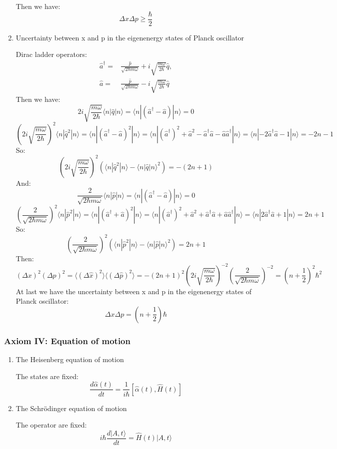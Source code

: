 \documentclass[12pt]{article}
\numberwithin{equation}{section}
\begin{document}
\begin{enumerate}
	Then we have:
	\begin{equation}
		\Delta x \Delta p \geq \frac{\hbar}{2}
	\end{equation}
\item Uncertainty between x and p in the eigenenergy states of Planck oscillator \par
	Dirac ladder operators:
	\begin{equation}\begin{split}
		\hat{a}^\dag=&\frac{\hat{p}}{\sqrt{2\hbar m\omega}}+i\sqrt{\frac{m\omega}{2\hbar}}\hat{q},\\
		\hat{a}=&\frac{\hat{p}}{\sqrt{2\hbar m\omega}}-i\sqrt{\frac{m\omega}{2\hbar}}\hat{q}
	\end{split}\end{equation}
	Then we have:
	\[2i\sqrt{\frac{m\omega}{2\hbar}}\langle n|\hat{q}|n\rangle=\langle n|(\hat{a}^\dag-\hat{a})|n\rangle=0\]
	\[(2i\sqrt{\frac{m\omega}{2\hbar}})^2\langle n|\hat{q}^2|n\rangle
	=\langle n|(\hat{a}^\dag-\hat{a})^2|n\rangle
	=\langle n|(\hat{a}^\dag)^2+\hat{a}^2-\hat{a}^{\dag} \hat{a}-\hat{a}\hat{a}^{\dag}|n\rangle
	=\langle n|-2\hat{a}^\dag\hat{a}-1|n \rangle=-2n-1\]
	So:
	\[(2i\sqrt{\frac{m\omega}{2\hbar}})^2(\langle n|\hat{q}^2|n\rangle-\langle n|\hat{q}|n\rangle^2)=-(2n+1)\]
	And:
	\[\frac{2}{\sqrt{2\hbar m\omega}}\langle n|\hat{p}|n\rangle=\langle n|(\hat{a}^\dag-\hat{a})|n\rangle=0\]
	\[(\frac{2}{\sqrt{2\hbar m\omega}})^2\langle n|\hat{p}^2|n\rangle
	=\langle n|(\hat{a}^\dag+\hat{a})^2|n\rangle
	=\langle n|(\hat{a}^\dag)^2+\hat{a}^2+\hat{a}^{\dag} \hat{a}+\hat{a}\hat{a}^{\dag}|n\rangle
	=\langle n|2\hat{a}^\dag\hat{a}+1|n \rangle=2n+1\]
	So:
	\[(\frac{2}{\sqrt{2\hbar m\omega}})^2(\langle n|\hat{p}^2|n\rangle-\langle n|\hat{p}|n\rangle^2)=2n+1\]
	Then:
	\[(\Delta x)^2(\Delta p)^2=\langle(\Delta \hat{x})^2 \rangle \langle(\Delta \hat{p})^2 \rangle=-(2n+1)^2(2i\sqrt{\frac{m\omega}{2\hbar}})^{-2}(\frac{2}{\sqrt{2\hbar m\omega}})^{-2}=(n+\frac{1}{2})^2\hbar^2\]
	At last we have the uncertainty between x and p in the eigenenergy states of Planck oscillator:
	\begin{equation}
		\Delta x\Delta p=(n+\frac{1}{2})\hbar
	\end{equation}
\end{enumerate}
\subsubsection{Axiom IV: Equation of motion}
\begin{enumerate}
\item The Heisenberg equation of motion \par
	The states are fixed: 
	\begin{equation}
		\frac{d\hat{\alpha}(t)}{dt}=\frac{1}{i\hbar}[\hat{\alpha}(t), \hat{H}(t)]
	\end{equation}
\item The Schr\"{o}dinger equation of motion \par
	The operator are fixed:
	\begin{equation}
		i\hbar\frac{d|A, t\rangle}{dt}=\hat{H}(t)|A, t\rangle
	\end{equation}
\end{enumerate}
\end{document}
